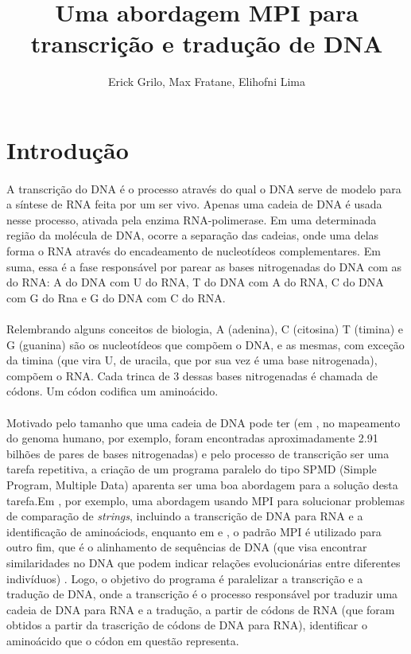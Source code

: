 \documentclass[a4paper,10pt]{article}
\title{Uma abordagem MPI para transcrição e tradução de DNA}
\author{Erick Grilo, Max Fratane, Elihofni Lima}
\begin{document}
\maketitle
\newpage

\section{Introdução}
\paragraph{}A transcrição do DNA é o processo através do qual o DNA serve de modelo para a síntese de RNA feita por um ser vivo. Apenas uma cadeia de DNA é usada nesse processo, ativada pela enzima RNA-polimerase. Em uma determinada região da molécula de DNA, ocorre a separação das cadeias, onde uma delas forma o RNA através do encadeamento de nucleotídeos complementares. Em suma, essa é a fase responsável por parear as bases nitrogenadas do DNA com as do RNA: A do DNA com U do RNA, T do DNA com A do RNA, C do DNA com G do Rna e G do DNA com C do RNA.

\paragraph{}Relembrando alguns conceitos de biologia, A (adenina), C (citosina) T (timina) e G (guanina) são os nucleotídeos que compõem o DNA, e as mesmas, com exceção da timina (que vira U, de uracila, que por sua vez é uma base nitrogenada), compõem o RNA. Cada trinca de 3 dessas bases nitrogenadas é chamada de códons. Um códon codifica um aminoácido.

\paragraph{}Motivado pelo tamanho que uma cadeia de DNA pode ter (em \citet{venter2001sequence}, no mapeamento do genoma humano, por exemplo, foram encontradas aproximadamente 2.91 bilhões de pares de bases nitrogenadas) e pelo processo de transcrição ser uma tarefa repetitiva, a criação de um programa paralelo do tipo SPMD (Simple Program, Multiple Data) aparenta ser uma boa abordagem para a solução desta tarefa.Em  \citet{chibli2008multiprocessor}, por exemplo, uma abordagem usando MPI para solucionar problemas de comparação de \emph{strings}, incluindo a transcrição de DNA para RNA e a identificação de aminoáciods, enquanto em \citet{kleinjung2002parallelized} e \citet{xue2014parallel}, o padrão MPI é utilizado para outro fim, que é o alinhamento de sequências de DNA (que visa encontrar similaridades no DNA que podem indicar relações evolucionárias entre diferentes indivíduos) . Logo, o objetivo do programa é paralelizar a transcrição e a tradução de DNA, onde a transcrição é o processo responsável por traduzir uma cadeia de DNA para RNA e a tradução, a partir de códons de RNA (que foram obtidos a partir da trascrição de códons de DNA para RNA), identificar o aminoácido que o códon em questão representa.
\end{document}
